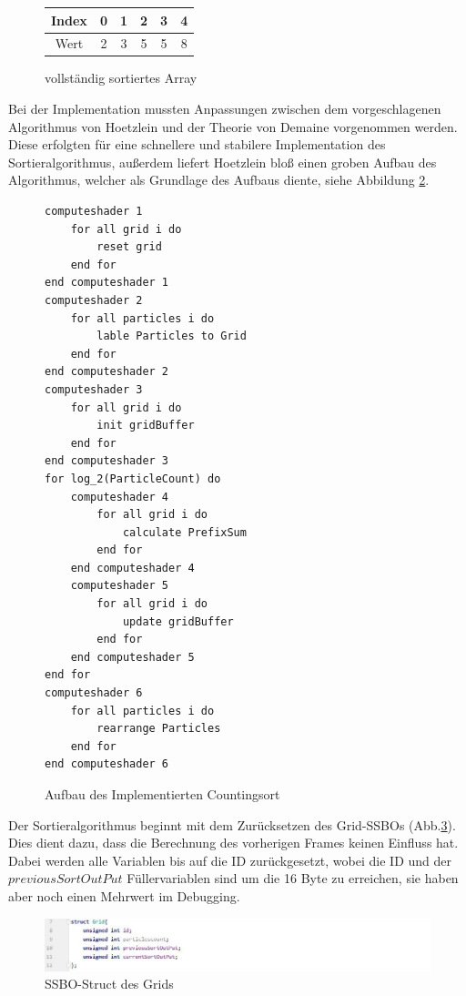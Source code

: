 \documentclass[intern,palatino]{cgBA}
\begin{document}
\begin{figure}[H]
	\centering
	\begin{tabular}{ | c || c | c | c | c | c |}
		\hline
		Index 				&  0 & 1 & 2 & 3 & 4 \\ \hline
		Wert				&  2 & 3 & 5 & 5 & 8 \\
		\hline
	\end{tabular}
	\caption{vollständig sortiertes Array}
	\label{tab:Counting4}
\end{figure}


Bei der Implementation mussten Anpassungen zwischen dem vorgeschlagenen Algorithmus von Hoetzlein \cite{nvidia} und der Theorie von Demaine \cite{counting} vorgenommen werden. Diese erfolgten für eine schnellere und stabilere Implementation des Sortieralgorithmus, außerdem liefert Hoetzlein bloß einen groben Aufbau des Algorithmus, welcher als Grundlage des Aufbaus diente, siehe Abbildung \ref{code:Counting}.
\newline

\begin{figure}[H]
	\centering
	\begin{lstlisting}
computeshader 1
	for all grid i do
		reset grid
	end for
end computeshader 1
computeshader 2
	for all particles i do
		lable Particles to Grid
	end for
end computeshader 2
computeshader 3
	for all grid i do
		init gridBuffer
	end for
end computeshader 3
for log_2(ParticleCount) do
	computeshader 4
		for all grid i do
			calculate PrefixSum
		end for
	end computeshader 4
	computeshader 5
		for all grid i do
			update gridBuffer
		end for
	end computeshader 5
end for
computeshader 6
	for all particles i do
		rearrange Particles
	end for
end computeshader 6
	\end{lstlisting}
	\caption{Aufbau des Implementierten Countingsort}
	\label{code:Counting}
\end{figure}

Der Sortieralgorithmus beginnt mit dem Zurücksetzen des Grid-SSBOs (Abb.\ref{img:GridStruct}). Dies dient dazu, dass die  Berechnung des vorherigen Frames keinen Einfluss hat. Dabei werden alle Variablen bis auf die ID zurückgesetzt, wobei die ID und der $previousSortOutPut$ Füllervariablen sind um die 16 Byte zu erreichen, sie haben aber noch einen Mehrwert im Debugging.

\begin{figure}[H]
	\centering
	\includegraphics[width=1.3\columnwidth]{Bilder/GridStruct.jpg}
	\caption{SSBO-Struct des Grids}
	\label{img:GridStruct}
\end{figure}
\end{document}
